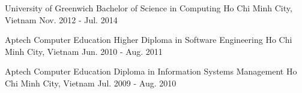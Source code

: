 


\begin{cventries}


\cventry
{University of Greenwich}
{Bachelor of Science in Computing}
{Ho Chi Minh City, Vietnam}
{Nov. 2012 - Jul. 2014}
{
\begin{cvitems}
\end{cvitems}
}


\cventry
{Aptech Computer Education}
{Higher Diploma in Software Engineering}
{Ho Chi Minh City, Vietnam}
{Jun. 2010 - Aug. 2011}
{
\begin{cvitems}
\end{cvitems}
}


\cventry
{Aptech Computer Education}
{Diploma in Information Systems Management}
{Ho Chi Minh City, Vietnam}
{Jul. 2009 - Aug. 2010}
{
\begin{cvitems}
\end{cvitems}
}


\end{cventries}
